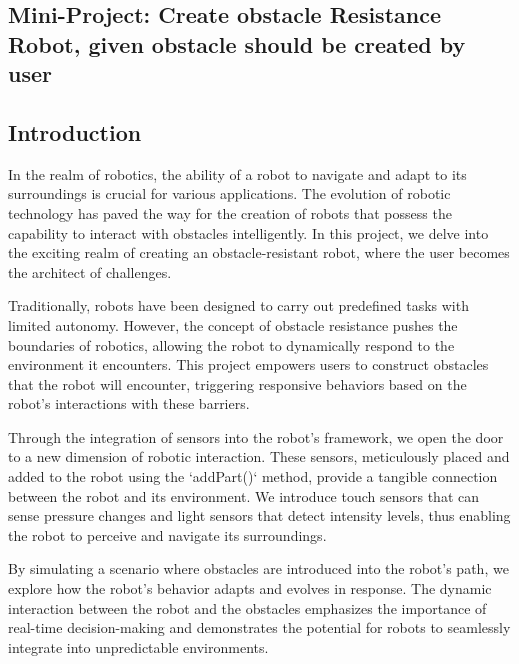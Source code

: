 \begin{center}
\section{Mini-Project: Create obstacle Resistance Robot, given obstacle should be created by user}
\end{center}
\label{sec:first-n-follow}

\subsection{Introduction}
In the realm of robotics, the ability of a robot to navigate and adapt to its surroundings is crucial for various applications. The evolution of robotic technology has paved the way for the creation of robots that possess the capability to interact with obstacles intelligently. In this project, we delve into the exciting realm of creating an obstacle-resistant robot, where the user becomes the architect of challenges.

Traditionally, robots have been designed to carry out predefined tasks with limited autonomy. However, the concept of obstacle resistance pushes the boundaries of robotics, allowing the robot to dynamically respond to the environment it encounters. This project empowers users to construct obstacles that the robot will encounter, triggering responsive behaviors based on the robot's interactions with these barriers.

Through the integration of sensors into the robot's framework, we open the door to a new dimension of robotic interaction. These sensors, meticulously placed and added to the robot using the `addPart()` method, provide a tangible connection between the robot and its environment. We introduce touch sensors that can sense pressure changes and light sensors that detect intensity levels, thus enabling the robot to perceive and navigate its surroundings.

By simulating a scenario where obstacles are introduced into the robot's path, we explore how the robot's behavior adapts and evolves in response. The dynamic interaction between the robot and the obstacles emphasizes the importance of real-time decision-making and demonstrates the potential for robots to seamlessly integrate into unpredictable environments.

